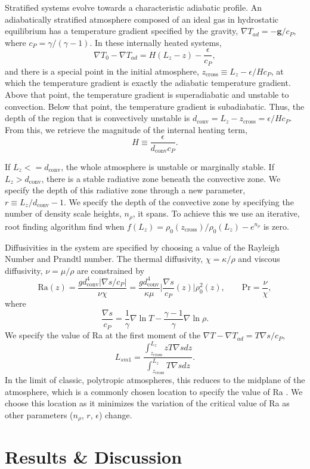\documentclass[aps, pre, onecolumn, nofootinbib, notitlepage, groupedaddress, amsfonts, amssymb, amsmath, longbibliography]{revtex4-1}
\newcommand{\grad}{\ensuremath{\nabla}}
\begin{document}
Stratified systems evolve towards a characteristic adiabatic profile.  An adiabatically
stratified atmosphere composed of an ideal gas in hydrostatic equilibrium has a
temperature gradient specified by the gravity, $\grad T_{ad} = -\bm{g} / c_P$, where
$c_P = \gamma/(\gamma-1)$.  In these internally heated systems,
\begin{equation}
\grad T_0 - \grad T_{ad} = H(L_z - z) - \frac{\epsilon}{c_P},
\end{equation}
and there is a special point in the initial atmosphere, $z_{\text{cross}} \equiv L_z - \epsilon / H c_P$,
at which the temperature gradient is exactly the adiabatic temperature gradient.  Above that point,
the temperature gradient is superadiabatic and unstable to convection.  Below that point,
the temperature gradient is subadiabatic.  Thus, the depth of the region that is convectively
unstable is $d_{\text{conv}} = L_z - z_{\text{cross}} = \epsilon / H c_P$.  From this,
we retrieve the magnitude of the internal heating term,
\begin{equation}
H \equiv \frac{\epsilon}{d_{\text{conv}} c_P}.
\end{equation}

If $L_z <= d_{\text{conv}}$, the whole atmosphere is unstable or marginally stable.
If $L_z > d_{\text{conv}}$, there is a stable radiative zone beneath the convective
zone.  We specify the depth of this radiative zone through a new parameter,
$r \equiv L_z/d_{\text{conv}} - 1$.  We specify the depth of the convective zone by
specifying the number of density scale heights, $n_\rho$, it spans.  To achieve this we
use an iterative, root finding algorithm find when
$f(L_z) = \rho_0(z_{\text{cross}})/\rho_0(L_z) -  e^{n_\rho}$ is zero.

Diffusivities in the system are specified by choosing a value of the Rayleigh
Number and Prandtl number.  The thermal diffusivity, $\chi = \kappa / \rho$ and
viscous diffusivity, $\nu = \mu / \rho$ are constrained by
\begin{equation}
\text{Ra}(z) = \frac{g d_{\text{conv}}^4 \bigg|\grad s / c_P\bigg|}{\nu\chi} = 
\frac{g d_{\text{conv}}^4}{\kappa\mu}\bigg|\frac{\grad s}{c_P}(z)\bigg|\rho_0^2(z),\qquad
\text{Pr} = \frac{\nu}{\chi},
\end{equation}
where 
\begin{equation}
\frac{\grad s}{c_P} = \frac{1}{\gamma} \grad\ln T - \frac{\gamma-1}{\gamma} \grad \ln \rho.
\end{equation}
We specify the value of Ra at the first moment of the $\grad T - \grad T_{ad} = T \grad s / c_P$,
\begin{equation}
L_{sm1} = \frac{\int_{z_{\text{cross}}}^{L_z} z T\grad s dz}{\int_{z_{\text{cross}}}^{L_z} T\grad s dz}.
\end{equation}
In the limit of classic, polytropic atmospheres, this reduces to the midplane of the atmosphere,
which is a commonly chosen location to specify the value of Ra \citep{hurlburt&all1984}.  We choose this location as it
minimizes the variation of the critical value of Ra as other parameters ($n_\rho$, $r$, $\epsilon$)
change.


\section{Results \& Discussion}
\label{sec:results}


\end{document}
